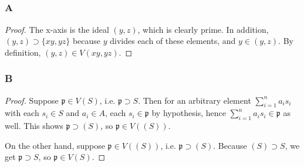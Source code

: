 \documentclass{article}
\newcommand{\frkp}{\mathfrak{p}}
\begin{document}
\subsection{}
\subsection{}
\subsubsection{A}\label{3.4.A}
\begin{proof}
    The x-axis is the ideal $(y,z)$, which is clearly prime. In addition, $(y,z)\supset \{xy, yz\}$ because $y$ divides each of these elements, and $y\in (y,z)$. By definition, $(y,z)\in V(xy,yz)$.
\end{proof}
\subsubsection{B}\label{3.4.B}
\begin{proof}
    Suppose $\frkp \in V(S)$, i.e. $\frkp \supset S$. Then for an arbitrary element $\sum_{i=1}^n a_i s_i$ with each $s_i\in S$ and $a_i\in A$, each $s_i \in \frkp$ by hypothesis, hence $\sum_{i=1}^n a_i s_i\in \frkp$ as well. This shows $\frkp \supset (S)$, so $\frkp \in V((S))$.

    On the other hand, suppose $\frkp \in V((S))$, i.e. $\frkp \supset (S)$. Because $(S)\supset S$, we get $\frkp \supset S$, so $\frkp \in V(S)$.
\end{proof}
\end{document}
